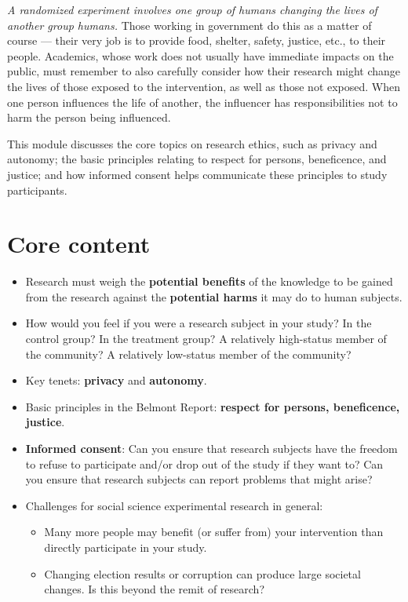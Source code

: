 \documentclass[12pt,]{book}
\begin{document}
\emph{A randomized experiment involves one group of humans changing the lives of another group humans.} Those working in government do this as a matter of course --- their very job is to provide food, shelter, safety, justice, etc., to their people. Academics, whose work does not usually have immediate impacts on the public, must remember to also carefully consider how their research might change the lives of those exposed to the intervention, as well as those not exposed. When one person influences the life of another, the influencer has responsibilities not to harm the person being influenced.

This module discusses the core topics on research ethics, such as privacy and autonomy; the basic principles relating to respect for persons, beneficence, and justice; and how informed consent helps communicate these principles to study participants.

\hypertarget{core-content-8}{%
\section{Core content}\label{core-content-8}}

\begin{itemize}
\item
  Research must weigh the \textbf{potential benefits} of the knowledge to be gained from the research against the \textbf{potential harms} it may do to human subjects.
\item
  How would you feel if you were a research subject in your study? In the control group? In the treatment group? A relatively high-status member of the community? A relatively low-status member of the community?
\item
  Key tenets: \textbf{privacy} and \textbf{autonomy}.
\item
  Basic principles in the Belmont Report: \textbf{respect for persons, beneficence, justice}.
\item
  \textbf{Informed consent}: Can you ensure that research subjects have the freedom to refuse to participate and/or drop out of the study if they want to? Can you ensure that research subjects can report problems that might arise?
\item
  Challenges for social science experimental research in general:

  \begin{itemize}
  \item
    Many more people may benefit (or suffer from) your intervention than directly participate in your study.
  \item
    Changing election results or corruption can produce large societal changes. Is this beyond the remit of research?
  \end{itemize}
\end{itemize}
\end{document}

